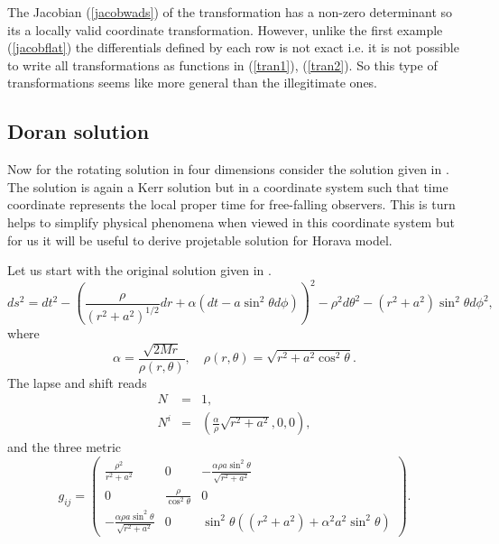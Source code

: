 \documentclass[preprint,aps,tightenlines,showkeys,nofootinbib,superscriptaddress,amsmath]{revtex4}
\begin{document}
The Jacobian (\ref{jacobwads}) of the transformation has a non-zero
determinant so its a locally valid coordinate transformation. However,
unlike the first example (\ref{jacobflat}) the differentials defined
by each row is not exact i.e. it is not possible to write all transformations as
functions in (\ref{tran1}), (\ref{tran2}). So this type of
transformations seems like more general than the illegitimate ones.
\subsection{Doran solution}
Now for the rotating solution in four dimensions consider the
solution given in \cite{Doran:1999gb}. The solution is again a Kerr solution but
in a coordinate system such that time coordinate represents the local proper
time for free-falling observers. This is turn helps to simplify
physical phenomena when viewed in this coordinate system but for us
it will be useful to derive projetable solution for Horava model.

Let us start with the original solution given in \cite{Doran:1999gb}.
\begin{equation}
ds^{2}= dt^{2}-\left(\frac{\rho}{(r^{2}+a^{2})^{1 / 2}}dr+\alpha
(dt-a \sin^{2}\theta d \phi )  \right)^{2}-\rho ^{2}  d \theta
^{2}-(r^{2}+a^{2}  )\sin ^{2}\theta d \phi ^{2},
\end{equation}
where
\begin{equation}
\alpha = \frac{\sqrt{2Mr} }{\rho (r,\theta )}, \quad \rho (r,\theta
)=\sqrt{r^{2}+a^{2}\cos ^{2}\theta    }.
\end{equation}
The lapse and shift reads
\begin{eqnarray}
N&=& 1,\\
N^{i} &=&\left(\frac{\alpha}{\rho }\sqrt{r^{2}+a^{2} },0,0 \right),
\end{eqnarray}
and the three metric
\begin{equation}
g_{ij}=
\begin{pmatrix}
  \frac{\rho^{2}}{r^{2}+a^{2}   }  & 0 & - \frac{\alpha \rho a \sin
  ^{2}\theta  }{\sqrt{r^{2}+a^{2}  } }\\
  0 & \frac{\rho}{\cos ^{2}\theta  } & 0\\
  - \frac{\alpha \rho a \sin
  ^{2}\theta  }{\sqrt{r^{2}+a^{2}  } }& 0 & \sin ^{2}\theta
  \left((r^{2}+a^{2}  )+\alpha ^{2}a^{2}\sin ^{2}\theta \right)
\end{pmatrix}.
\end{equation}
\end{document}
